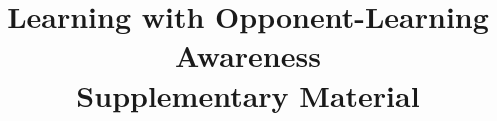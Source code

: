 \documentclass[letterpaper]{article}
\begin{document}
 
	
	\title{Learning with Opponent-Learning Awareness \\\vspace{0.2cm}
	Supplementary Material}
	
\date{}
	
	\author{	}
	
	\maketitle
	
\appendix

\end{document}

